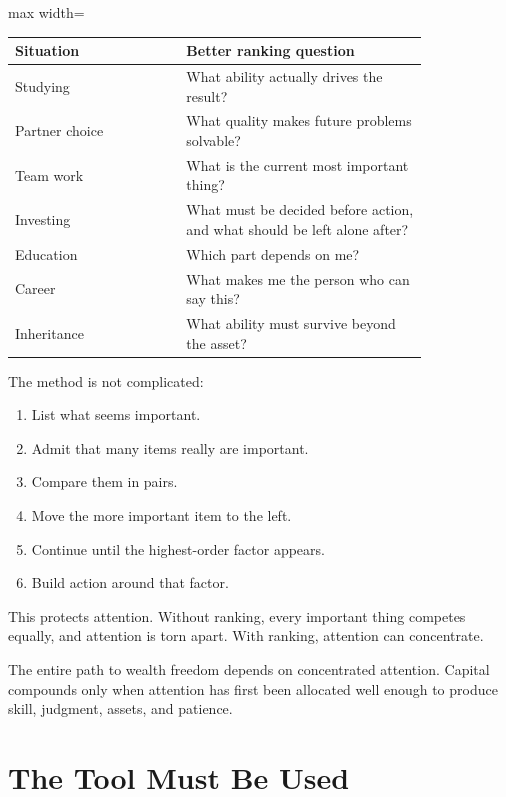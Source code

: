 \begin{center}
\begin{adjustbox}{max width=\linewidth}
\begin{tabular}{p{0.34\linewidth}p{0.48\linewidth}}
\hline
Situation & Better ranking question \\
\hline
Studying & What ability actually drives the result? \\
Partner choice & What quality makes future problems solvable? \\
Team work & What is the current most important thing? \\
Investing & What must be decided before action, and what should be left alone after? \\
Education & Which part depends on me? \\
Career & What makes me the person who can say this? \\
Inheritance & What ability must survive beyond the asset? \\
\hline
\end{tabular}
\end{adjustbox}
\end{center}

The method is not complicated:

\begin{enumerate}
\item List what seems important.
\item Admit that many items really are important.
\item Compare them in pairs.
\item Move the more important item to the left.
\item Continue until the highest-order factor appears.
\item Build action around that factor.
\end{enumerate}

This protects attention. Without ranking, every important thing competes equally, and attention is torn apart. With ranking, attention can concentrate.

The entire path to wealth freedom depends on concentrated attention. Capital compounds only when attention has first been allocated well enough to produce skill, judgment, assets, and patience.

\section*{The Tool Must Be Used}

